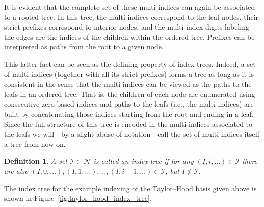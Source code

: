 \documentclass[a4paper,10pt,headings=normal,bibliography=totoc]{scrartcl}
\newtheorem{definition}{Definition}
\begin{document}
It is evident that the complete set of these multi-indices can again be associated to a rooted tree.
In this tree, the multi-indices correspond to the leaf nodes,
their strict prefixes correspond to interior nodes,
and the multi-index digits labeling the edges are the
indices of the children within the ordered tree.  Prefixes can be
interpreted as paths from the root to a given node.

This latter fact can be seen as the defining property of index trees.  Indeed,
a set of multi-indices (together with all its strict prefixes)
forms a tree as long as it is consistent in the sense that the multi-indices
can be viewed as the paths to the leafs in an ordered tree.
That is, the children of each node are enumerated using consecutive zero-based
indices and paths to the leafs (i.e., the multi-indices) are built by concatenating
those indices starting from the root and ending in a leaf.
Since the full structure of this tree is encoded in the multi-indices associated
to the leafs we will---by a slight abuse of notation---call the set of multi-indices
itself a tree from now on.

\begin{definition}
\label{def:index_tree}
 A set $\mathcal{I} \subset \mathcal{N}$ is called an \emph{index tree}
 if for any $(I,i,\dots) \in \mathcal{I}$ there are also $(I,0,\dots),(I,1,\dots),\dots,(I,i-1,\dots) \in \mathcal{I}$,
 but $I \notin \mathcal{I}$.
\end{definition}
The index tree for the example indexing of the Taylor--Hood basis given above is shown
in Figure~\ref{fig:taylor_hood_index_tree}.
\end{document}
